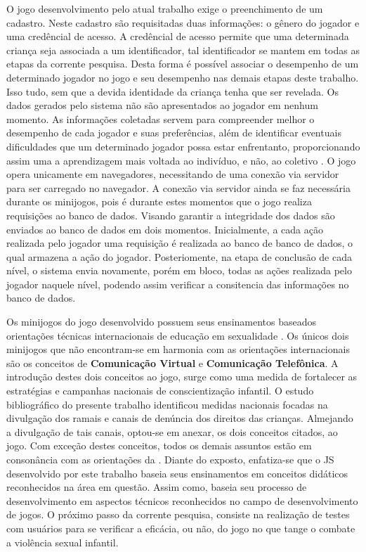 O jogo desenvolvimento pelo atual trabalho exige o preenchimento de um cadastro. Neste cadastro são requisitadas duas informações: o gênero do jogador e uma credêncial de acesso. A credêncial de acesso permite que uma determinada criança seja associada a um identificador, tal identificador se mantem em todas as etapas da corrente pesquisa. Desta forma é possível associar o desempenho de um determinado jogador no jogo e seu desempenho nas demais etapas deste trabalho. Isso tudo, sem que a devida identidade da criança tenha que ser revelada. Os dados gerados pelo sistema não são apresentados ao jogador em nenhum momento. As informações coletadas servem para compreender melhor o desempenho de cada jogador e suas preferências, além de identificar eventuais dificuldades que um determinado jogador possa estar enfrentanto, proporcionando assim uma a aprendizagem mais voltada ao indivíduo, e não, ao coletivo \cite{carrara2018criancca}. O jogo opera unicamente em navegadores, necessitando de uma conexão via servidor para ser carregado no navegador. A conexão via servidor ainda se faz necessária durante os minijogos, pois é durante estes momentos que o jogo realiza requisições ao banco de dados. Visando garantir a integridade dos dados são enviados ao banco de dados em dois momentos. Inicialmente, a cada ação realizada pelo jogador uma requisição é realizada ao banco de banco de dados, o qual armazena a ação do jogador. Posteriomente, na etapa de conclusão de cada nível, o sistema envia novamente, porém em bloco, todas as ações realizada pelo jogador naquele nível, podendo assim verificar a consitencia das informações no banco de dados. 

Os minijogos do jogo desenvolvido possuem seus ensinamentos baseados orientações técnicas internacionais de educação em sexualidade \cite{unesco2018international}. Os únicos dois minijogos que não encontram-se em harmonia com as orientações internacionais são os conceitos de \textbf{Comunicação Virtual} e \textbf{Comunicação Telefônica}. A introdução destes dois conceitos ao jogo, surge como uma medida de fortalecer as estratégias e campanhas nacionais de conscientização infantil. O estudo bibliográfico do presente trabalho identificou medidas nacionais focadas na divulgação dos ramais e canais de denúncia dos direitos das crianças. Almejando a divulgação de tais canais, optou-se em anexar, os dois conceitos citados, ao jogo. Com exceção destes conceitos, todos os demais assuntos estão em consonância com as orientações da . Diante do exposto, enfatiza-se que o \ac{JS} desenvolvido por este trabalho baseia seus ensinamentos em conceitos didáticos reconhecidos na área em questão. Assim como, baseia seu processo de desenvolvimento em aspectos técnicos reconhecidos no campo de  desenvolvimento de jogos. O próximo passo da corrente pesquisa, consiste na realização de testes com usuários para se verificar a eficácia, ou não, do jogo no que tange o combate a violência sexual infantil. 